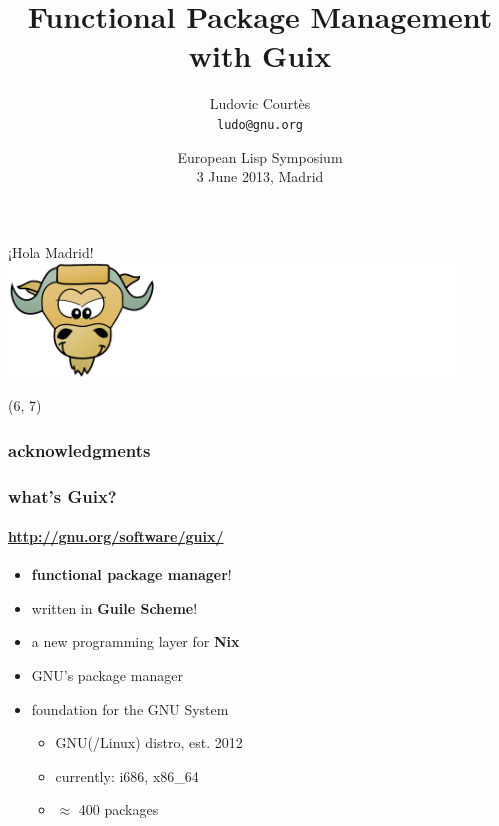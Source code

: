 \documentclass{beamer}
\title[]{Functional Package Management with Guix}
\author{Ludovic Courtès\\\texttt{ludo@gnu.org}}
\date{\small{European Lisp Symposium\\3 June 2013, Madrid}}
\begin{document}
\maketitle

\begin{frame}{¡Hola Madrid!}
  \includegraphics[width=0.9\textwidth]{images/guile-banner-white}
  \\[0.7em]
  \begin{textblock}{15}(6, 7)
  \end{textblock}
\end{frame}

\begin{frame}
  \frametitle{acknowledgments}
\end{frame}

\begin{frame}
  \frametitle{what's Guix?}
  \framesubtitle{\url{http://gnu.org/software/guix/}}

  \begin{itemize}
  \item<1-> \textbf{functional package manager}!
  \item<1-> written in \textbf{Guile Scheme}!
  \item<2-> a new programming layer for \textbf{Nix}
  \item<3-> GNU's package manager
  \item<4->{foundation for the GNU System
      \begin{itemize}
        \item GNU(/Linux) distro, est. 2012
        \item currently: i686, x86\_64
        \item $\approx$ 400 packages
      \end{itemize}
    }
  \end{itemize}
\end{frame}
\end{document}
